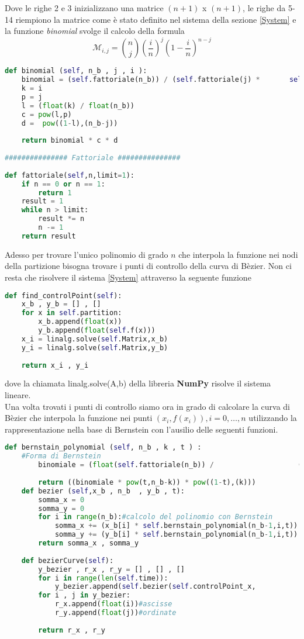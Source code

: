 \documentclass[a4paper,12pt]{report}
\theoremstyle{definition}
\begin{document}
Dove le righe 2 e 3 inizializzano una matrice $(n+1)$ x $(n+1)$, le righe da 5-14 riempiono la matrice come è stato definito nel sistema della sezione \ref{System} e la funzione \textit{binomial} svolge il calcolo della formula $$\mathcal{M}_{i,j} = \binom{n}{j}  \left(\frac{i}{n}\right)^j \left(1-\frac{i}{n}\right)^{n-j}$$
\begin{lstlisting}[language=Python]
def binomial (self, n_b , j , i ):
	binomial = (self.fattoriale(n_b)) / (self.fattoriale(j) * 		self.fattoriale(n_b-j))
	k = i
	p = j
	l = (float(k) / float(n_b))
	c = pow(l,p)
	d =  pow((1-l),(n_b-j))     
	
	return binomial * c * d   
	
############### Fattoriale ###############	
	
def fattoriale(self,n,limit=1):
	if n == 0 or n == 1:
		return 1
	result = 1
	while n > limit:
		result *= n
		n -= 1
	return result
\end{lstlisting}
Adesso per trovare l'unico polinomio di grado $n$ che interpola la funzione nei nodi della partizione bisogna trovare i punti di controllo della curva di Bèzier. Non ci resta che risolvere il sistema \ref{System} attraverso la seguente funzione
\begin{lstlisting}[language=Python]
def find_controlPoint(self):
	x_b , y_b = [] , []
	for x in self.partition:
		x_b.append(float(x))
		y_b.append(float(self.f(x)))
	x_i = linalg.solve(self.Matrix,x_b)
	y_i = linalg.solve(self.Matrix,y_b)
	
	return x_i , y_i
\end{lstlisting}
dove la chiamata linalg.solve(A,b) della libreria \textbf{NumPy} risolve il sistema lineare. \\
Una volta trovati i punti di controllo siamo ora in grado di calcolare la curva di Bèzier che interpola la funzione nei punti $(x_i,f(x_i)), i = 0, \ldots, n$ utilizzando la rappresentazione nella base di Bernstein con l'ausilio delle seguenti funzioni.
\begin{lstlisting}[language=Python]
	def bernstain_polynomial (self, n_b , k , t ) :
	#Forma di Bernstein
		binomiale = (float(self.fattoriale(n_b)) /                    (float(self.fattoriale(k)) * float(self.fattoriale(n_b-k))))
	
		return ((binomiale * pow(t,n_b-k)) * pow((1-t),(k)))   
	def bezier (self,x_b , n_b  , y_b , t):
		somma_x = 0
		somma_y = 0
		for i in range(n_b):#calcolo del polinomio con Bernstein
			somma_x += (x_b[i] * self.bernstain_polynomial(n_b-1,i,t))
			somma_y += (y_b[i] * self.bernstain_polynomial(n_b-1,i,t))
		return somma_x , somma_y 
	
	def bezierCurve(self):
		y_bezier , r_x , r_y = [] , [] , []
		for i in range(len(self.time)):
			y_bezier.append(self.bezier(self.controlPoint_x,              len(self.partition),self.controlPoint_y,self.time[i]))
		for i , j in y_bezier:
			r_x.append(float(i))#ascisse
			r_y.append(float(j))#ordinate
	
		return r_x , r_y
\end{lstlisting}
\end{document}

